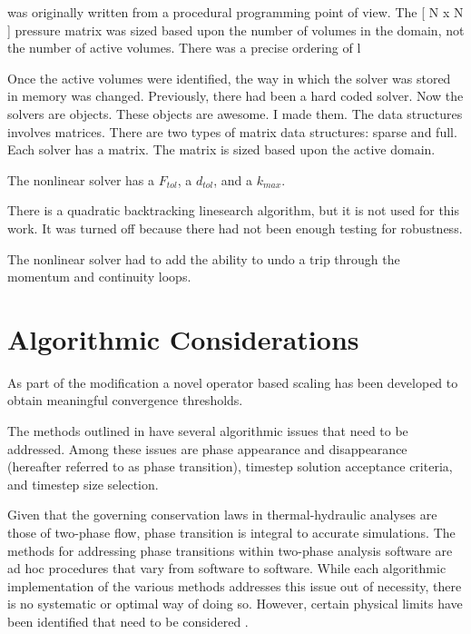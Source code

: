 
\cobra{} was originally written from a procedural programming point of view.
The [ N x N ] pressure matrix was sized based upon the number of volumes in the domain, not the number of active volumes.
There was a precise ordering of l

Once the active volumes were identified, the way in which the solver was stored in memory was changed.
Previously, there had been a hard coded solver.
Now the solvers are objects.
These objects are awesome.
I made them.
The data structures involves matrices.
There are two types of matrix data structures: sparse and full.
Each solver has a matrix.
The matrix is sized based upon the active domain.


The nonlinear solver has a $F_{tol}$, a $d_{tol}$, and a $k_{max}$.

There is a quadratic backtracking linesearch algorithm, but it is not used for this work.
It was turned off because there had not been enough testing for robustness.


The nonlinear solver had to add the ability to undo a trip through the momentum and continuity loops.

\section{Algorithmic Considerations}
\label{sect:algoConcerns}

As part of the \cobra{} modification a novel operator based scaling has been developed to obtain meaningful convergence thresholds.

The methods outlined in  have several algorithmic issues that need to be addressed.
Among these issues are phase appearance and disappearance (hereafter referred to as phase transition), timestep solution acceptance criteria, and timestep size selection.

Given that the governing conservation laws in thermal-hydraulic analyses are those of two-phase flow, phase transition is integral to accurate simulations.
The methods for addressing phase transitions within two-phase analysis software are ad hoc procedures that vary from software to software.
While each algorithmic implementation of the various methods addresses this issue out of necessity, there is no systematic or optimal way of doing so.
However, certain physical limits have been identified that need to be considered \cite{Bestion2000}.

